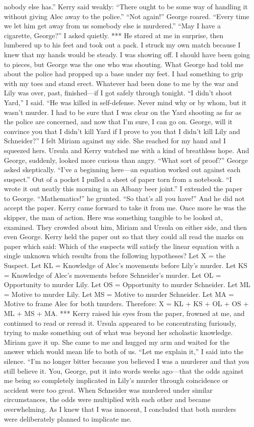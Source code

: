 \documentclass{novel}
\begin{document}
nobody else has.” Kerry said weakly: “There ought to be some way of handling it without giving Alec away to the police.” “Not again!” George roared. “Every time we let him get away from us somebody else is murdered.” “May I have a cigarette, George?” I asked quietly. *** He stared at me in surprise, then lumbered up to his feet and took out a pack. I struck my own match because I knew that my hands would be steady. I was showing off. I should have been going to pieces, but George was the one who was shouting. What George had told me about the police had propped up a base under my feet. I had something to grip with my toes and stand erect. Whatever had been done to me by the war and Lily was over, past, finished—if I got safely through tonight. “I didn’t shoot Yard,” I said. “He was killed in self-defense. Never mind why or by whom, but it wasn’t murder. I had to be sure that I was clear on the Yard shooting as far as the police are concerned, and now that I’m sure, I can go on. George, will it convince you that I didn’t kill Yard if I prove to you that I didn’t kill Lily and Schneider?” I felt Miriam against my side. She reached for my hand and I squeezed hers. Ursula and Kerry watched me with a kind of breathless hope. And George, suddenly, looked more curious than angry. “What sort of proof?” George asked skeptically. “I’ve a beginning here—an equation worked out against each suspect.” Out of a pocket I pulled a sheet of paper torn from a notebook. “I wrote it out neatly this morning in an Albany beer joint.” I extended the paper to George. “Mathematics!” he grunted. “So that’s all you have!” And he did not accept the paper. Kerry came forward to take it from me. Once more he was the skipper, the man of action. Here was something tangible to be looked at, examined. They crowded about him, Miriam and Ursula on either side, and then even George. Kerry held the paper out so that they could all read the marks on paper which said: Which of the suspects will satisfy the linear equation with a single unknown which results from the following hypotheses? Let X = the Suspect. Let KL = Knowledge of Alec’s movements before Lily’s murder. Let KS = Knowledge of Alec’s movements before Schneider’s murder. Let OL = Opportunity to murder Lily. Let OS = Opportunity to murder Schneider. Let ML = Motive to murder Lily. Let MS = Motive to murder Schneider. Let MA = Motive to frame Alec for both tnurders. Therefore: X = KL + KS + OL + OS + ML + MS + MA. *** Kerry raised his eyes from the paper, frowned at me, and continued to read or reread it. Ursula appeared to be concentrating furiously, trying to make something out of what was beyond her scholastic knowledge. Miriam gave it up. She came to me and hugged my arm and waited for the answer which would mean life to both of us. “Let me explain it,” I said into the silence. “I’m no longer bitter because you believed I was a murderer and that you still believe it. You, George, put it into words weeks ago—that the odds against me being so completely implicated in Lily’s murder through coincidence or accident were too great. When Schneider was murdered under similar circumstances, the odds were multiplied with each other and became overwhelming. As I knew that I was innocent, I concluded that both murders were deliberately planned to implicate me. 
\end{document}
